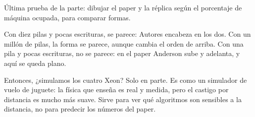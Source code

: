 Última prueba de la parte: dibujar el paper y la réplica según el porcentaje de máquina ocupada, para comparar formas.

Con diez pilas y pocas escrituras, se parece: Autores encabeza en los dos. Con un millón de pilas, la forma se parece, aunque cambia el orden de arriba. Con una pila y pocas escrituras, no se parece: en el paper Anderson sube y adelanta, y aquí se queda plano.

Entonces, ¿simulamos los cuatro Xeon? Solo en parte. Es como un simulador de vuelo de juguete: la física que enseña es real y medida, pero el castigo por distancia es mucho más suave. Sirve para ver qué algoritmos son sensibles a la distancia, no para predecir los números del paper.
